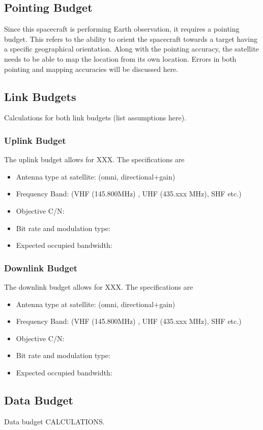 \subsection{Pointing Budget}
Since this spacecraft is performing Earth observation, it requires a pointing budget. This refers to the ability to orient the spacecraft towards a target having a specific geographical orientation. Along with the pointing accuracy, the satellite needs to be able to map the location from its own location. Errors in both pointing and mapping accuracies will be discussed here.

\subsection{Link Budgets}
Calculations for both link budgets (list assumptions here).

\subsubsection{Uplink Budget}
The uplink budget allows for XXX. The specifications are
\begin{itemize}
    \item Antenna type at satellite: (omni, directional$+$gain)
    \item Frequency Band: (VHF (145.800MHz) , UHF (435.xxx MHz), SHF etc.)
    \item Objective C/N:
    \item Bit rate and modulation type:
    \item Expected occupied bandwidth:
\end{itemize}

\subsubsection{Downlink Budget}
The downlink budget allows for XXX. The specifications are
\begin{itemize}
    \item Antenna type at satellite: (omni, directional$+$gain)
    \item Frequency Band: (VHF (145.800MHz) , UHF (435.xxx MHz), SHF etc.)
    \item Objective C/N:
    \item Bit rate and modulation type:
    \item Expected occupied bandwidth:
\end{itemize}

\subsection{Data Budget}
Data budget CALCULATIONS.



